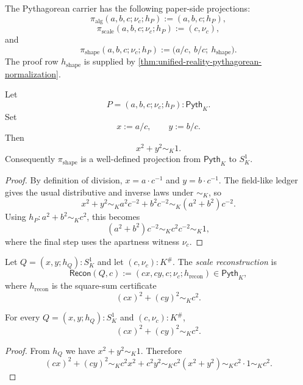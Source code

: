 \begin{definition}
\label{def:unified-reality-pythagorean-projections}
The Pythagorean carrier has the following paper-side projections:
$$
\pi_{\mathrm{alg}}(a,b,c;\nu_c;h_P):=(a,b,c;h_P),
$$
$$
\pi_{\mathrm{scale}}(a,b,c;\nu_c;h_P):=(c,\nu_c),
$$
and
$$
\pi_{\mathrm{shape}}(a,b,c;\nu_c;h_P)
:=
\bigl(a/c,\ b/c;\ h_{\mathrm{shape}}\bigr).
$$
The proof row $h_{\mathrm{shape}}$ is supplied by
\autoref{thm:unified-reality-pythagorean-normalization}.
\end{definition}

\begin{theorem}
\label{thm:unified-reality-pythagorean-normalization}
Let
$$
P=(a,b,c;\nu_c;h_P):\mathsf{Pyth}_K.
$$
Set
$$
x:=a/c,\qquad y:=b/c.
$$
Then
$$
x^2+y^2\sim_K1.
$$
Consequently $\pi_{\mathrm{shape}}$ is a well-defined projection from
$\mathsf{Pyth}_K$ to $S^1_K$.
\end{theorem}

\begin{proof}
By definition of division, $x=a\cdot c^{-1}$ and
$y=b\cdot c^{-1}$. The field-like ledger gives the usual distributive
and inverse laws under $\sim_K$, so
$$
x^2+y^2
\sim_K
a^2c^{-2}+b^2c^{-2}
\sim_K
(a^2+b^2)c^{-2}.
$$
Using $h_P:a^2+b^2\sim_Kc^2$, this becomes
$$
(a^2+b^2)c^{-2}
\sim_K
c^2c^{-2}
\sim_K
1,
$$
where the final step uses the apartness witness $\nu_c$.
\end{proof}


\begin{definition}
\label{def:unified-reality-pythagorean-scale-reconstruction}
Let $Q=(x,y;h_Q):S^1_K$ and let $(c,\nu_c):K^\#$. The
\emph{scale reconstruction} is
$$
\mathsf{Recon}(Q,c)
:=
(cx,cy,c;\nu_c;h_{\mathrm{recon}})
\in\mathsf{Pyth}_K,
$$
where $h_{\mathrm{recon}}$ is the square-sum certificate
$$
(cx)^2+(cy)^2\sim_Kc^2.
$$
\end{definition}

\begin{theorem}
\label{thm:unified-reality-pythagorean-scale-reconstruction}
For every $Q=(x,y;h_Q):S^1_K$ and $(c,\nu_c):K^\#$,
$$
(cx)^2+(cy)^2\sim_Kc^2.
$$
\end{theorem}

\begin{proof}
From $h_Q$ we have $x^2+y^2\sim_K1$. Therefore
$$
(cx)^2+(cy)^2
\sim_K
c^2x^2+c^2y^2
\sim_K
c^2(x^2+y^2)
\sim_K
c^2\cdot1
\sim_K
c^2.
$$
\end{proof}

